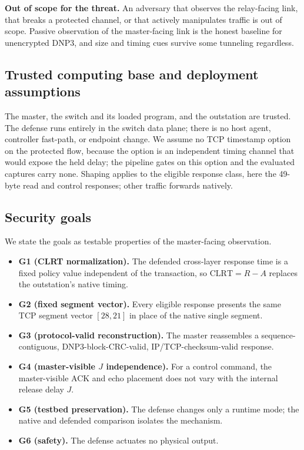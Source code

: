 \textbf{Out of scope for the threat.} An adversary that observes the relay-facing link, that breaks a
protected channel, or that actively manipulates traffic is out of scope. Passive observation of the
master-facing link is the honest baseline for unencrypted DNP3, and size and timing cues survive some
tunneling regardless.

\subsection{Trusted computing base and deployment assumptions}
The master, the switch and its loaded program, and the outstation are trusted. The defense runs
entirely in the switch data plane; there is no host agent, controller fast-path, or endpoint change.
We assume no TCP timestamp option on the protected flow, because the option is an independent timing
channel that would expose the held delay; the pipeline gates on this option and the evaluated
captures carry none. Shaping applies to the eligible response class, here the 49-byte read and control
responses; other traffic forwards natively.

\subsection{Security goals}
We state the goals as testable properties of the master-facing observation.
\begin{itemize}
\item \textbf{G1 (CLRT normalization).} The defended cross-layer response time is a fixed policy value
independent of the transaction, so $\mathrm{CLRT}=R-A$ replaces the outstation's native timing.
\item \textbf{G2 (fixed segment vector).} Every eligible response presents the same TCP segment
vector $[28,21]$ in place of the native single segment.
\item \textbf{G3 (protocol-valid reconstruction).} The master reassembles a sequence-contiguous,
DNP3-block-CRC-valid, IP/TCP-checksum-valid response.
\item \textbf{G4 (master-visible $J$ independence).} For a control command, the master-visible ACK and
echo placement does not vary with the internal release delay $J$.
\item \textbf{G5 (testbed preservation).} The defense changes only a runtime mode; the native and
defended comparison isolates the mechanism.
\item \textbf{G6 (safety).} The defense actuates no physical output.
\end{itemize}

